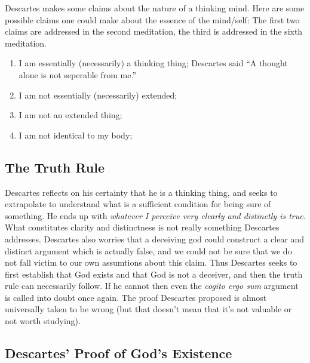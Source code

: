 Descartes makes some claims about the nature of a thinking mind. Here are some possible claims one could make about the essence of the mind/self: The first two claims are addressed in the second meditation, the third is addressed in the sixth meditation.
\begin{enumerate}
\item I am essentially (necessarily) a thinking thing; Descartes said ``A thought alone is not seperable from me.''
\item I am not essentially (necessarily) extended;
\item I am not an extended thing; 
\item I am not identical to my body;
\end{enumerate}

\subsection{The Truth Rule}

Descartes reflects on his certainty that he is a thinking thing, and seeks to extrapolate to understand what is a sufficient condition for being sure of something. He ends up with \emph{whatever I perceive very clearly and distinctly is true.} What constitutes clarity and distinctness is not really something Descartes addresses. Descartes also worries that a deceiving god could construct a clear and distinct argument which is actually false, and we could not be sure that we do not fall victim to our own assumtions about this claim. Thus Descartes seeks to first establish that God exists and that God is not a deceiver, and then the truth rule can necessarily follow. If he cannot then even the \emph{cogito ergo sum} argument is called into doubt once again. The proof Descartes proposed is almost universally taken to be wrong (but that doesn't mean that it's not valuable or not worth studying).

\subsection{Descartes' Proof of God's Existence}


